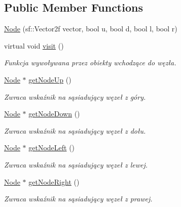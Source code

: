 \subsection*{Public Member Functions}
\begin{DoxyCompactItemize}
\item 
\hyperlink{classNode_a691046668b01fa3af260a3891c993f99}{Node} (sf\+::\+Vector2f vector, bool u, bool d, bool l, bool r)
\item 
\mbox{\label{classNode_a7cb557af2f8c31fa43fc4c75134750e8}} 
virtual void \hyperlink{classNode_a7cb557af2f8c31fa43fc4c75134750e8}{visit} ()
\begin{DoxyCompactList}\small\item\em Funkcja wywoływana przez obiekty wchodzące do węzła. \end{DoxyCompactList}\item 
\mbox{\label{classNode_a3076b2ad2aa24bad4d7989c40ed0c78c}} 
\hyperlink{classNode}{Node} $\ast$ \hyperlink{classNode_a3076b2ad2aa24bad4d7989c40ed0c78c}{get\+Node\+Up} ()
\begin{DoxyCompactList}\small\item\em Zwraca wskaźnik na sąsiadujący węzeł z góry. \end{DoxyCompactList}\item 
\mbox{\label{classNode_a9f1fb40744611d9bf3c6bce26b3c6b25}} 
\hyperlink{classNode}{Node} $\ast$ \hyperlink{classNode_a9f1fb40744611d9bf3c6bce26b3c6b25}{get\+Node\+Down} ()
\begin{DoxyCompactList}\small\item\em Zwraca wskaźnik na sąsiadujący węzeł z dołu. \end{DoxyCompactList}\item 
\mbox{\label{classNode_a1d337ac51fa169f1d282d97f34caa2e7}} 
\hyperlink{classNode}{Node} $\ast$ \hyperlink{classNode_a1d337ac51fa169f1d282d97f34caa2e7}{get\+Node\+Left} ()
\begin{DoxyCompactList}\small\item\em Zwraca wskaźnik na sąsiadujący węzeł z lewej. \end{DoxyCompactList}\item 
\mbox{\label{classNode_a3a10a1a2f045b29f38d2258e40d06160}} 
\hyperlink{classNode}{Node} $\ast$ \hyperlink{classNode_a3a10a1a2f045b29f38d2258e40d06160}{get\+Node\+Right} ()
\begin{DoxyCompactList}\small\item\em Zwraca wskaźnik na sąsiadujący węzeł z prawej. \end{DoxyCompactList}\end{DoxyCompactItemize}
